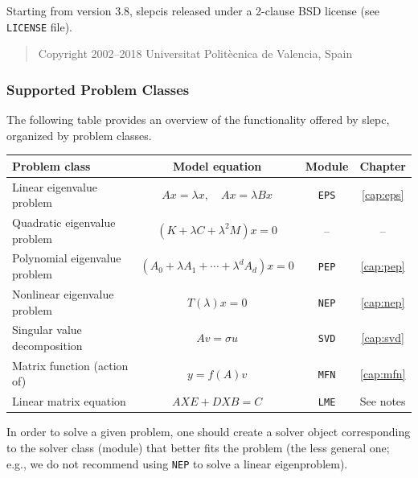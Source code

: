 \documentclass[titlepage,10pt,a4paper]{book}
\newcommand{\packnoi}[1]{{\sc #1}\xspace}
\newcommand{\slepc}{\texorpdfstring{\packnoi{slep\rm c}}{{SLEPc}}}
\begin{document}
{Starting from version 3.8, \slepc is released under a 2-clause BSD license (see \texttt{LICENSE} file).

\begin{quote}
\begin{sffamily}
Copyright 2002--2018 Universitat Polit\`ecnica de Valencia, Spain
\end{sffamily}
\end{quote}

\newpage
\subsubsection*{Supported Problem Classes}

The following table provides an overview of the functionality offered by \slepc, organized by problem classes.

\begin{table}[h]
\label{tab:modules}
\centering
{\small \begin{tabular}{lccc}
Problem class                 & Model equation  & Module       & Chapter \\\hline
Linear eigenvalue problem     & $Ax=\lambda x,\quad Ax=\lambda Bx$ & \texttt{EPS} & \ref{cap:eps} \\
Quadratic eigenvalue problem  & $(K+\lambda C+\lambda^2M)x=0$ & -- & -- \\
Polynomial eigenvalue problem & $(A_0+\lambda A_1+\cdots+\lambda^dA_d)x=0$ & \texttt{PEP} & \ref{cap:pep} \\
Nonlinear eigenvalue problem  & $T(\lambda)x=0$ & \texttt{NEP} & \ref{cap:nep} \\\hline
Singular value decomposition  & $Av=\sigma u$   & \texttt{SVD} & \ref{cap:svd} \\
Matrix function (action of)   & $y=f(A)v$   & \texttt{MFN} & \ref{cap:mfn} \\
Linear matrix equation        & $AXE+DXB=C$   & \texttt{LME} & See notes \\\hline
\end{tabular} }
\end{table}

\noindent In order to solve a given problem, one should create a solver object corresponding to the solver class (module) that better fits the problem (the less general one; e.g., we do not recommend using \texttt{NEP} to solve a linear eigenproblem).\\[3mm]

}
\end{document}
